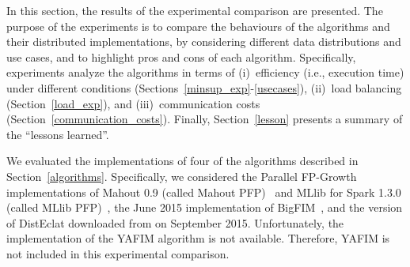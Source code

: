 
In this section, the results of the experimental comparison are presented.
The purpose of the experiments is to compare the behaviours of the algorithms
and their distributed implementations,
by considering  different data distributions and use cases, and to highlight
pros and cons of each algorithm.
Specifically, experiments analyze the algorithms in terms of
(i)~efficiency (i.e., execution time) under different conditions
(Sections~\ref{minsup_exp}-\ref{usecases}),
(ii)~load balancing (Section~\ref{load_exp}), and
(iii)~communication costs (Section~\ref{communication_costs}).
Finally, Section~\ref{lesson} presents a summary of the ``lessons learned''.


We evaluated the implementations of four of the algorithms described
in Section~\ref{algorithms}.
Specifically, we considered
the Parallel FP-Growth implementations
of Mahout 0.9 (called Mahout PFP)~\cite{Mahout}
and MLlib for Spark 1.3.0 (called MLlib PFP)~\cite{MLLib},
the June 2015 implementation of BigFIM~\cite{Bigfim_github},
and the version of DistEclat downloaded from \cite{Bigfim_github}
on September 2015.
Unfortunately, the implementation of the YAFIM algorithm is not available.
Therefore, YAFIM is not included in this experimental comparison.

